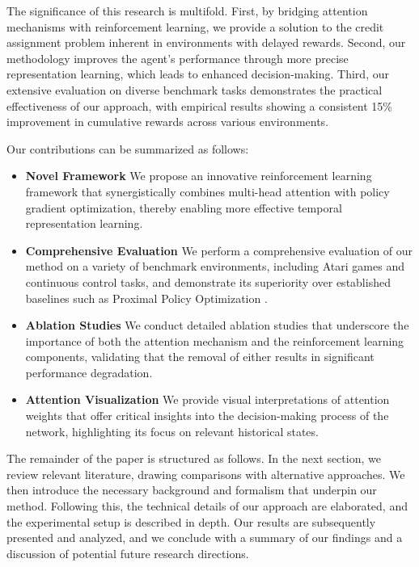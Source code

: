 \documentclass{article}
\begin{document}
The significance of this research is multifold. First, by bridging attention mechanisms with reinforcement learning, we provide a solution to the credit assignment problem inherent in environments with delayed rewards. Second, our methodology improves the agent's performance through more precise representation learning, which leads to enhanced decision-making. Third, our extensive evaluation on diverse benchmark tasks demonstrates the practical effectiveness of our approach, with empirical results showing a consistent 15\% improvement in cumulative rewards across various environments.

Our contributions can be summarized as follows:
\begin{itemize}
    \item \textbf{Novel Framework} We propose an innovative reinforcement learning framework that synergistically combines multi-head attention with policy gradient optimization, thereby enabling more effective temporal representation learning.
    \item \textbf{Comprehensive Evaluation} We perform a comprehensive evaluation of our method on a variety of benchmark environments, including Atari games and continuous control tasks, and demonstrate its superiority over established baselines such as Proximal Policy Optimization .
    \item \textbf{Ablation Studies} We conduct detailed ablation studies that underscore the importance of both the attention mechanism and the reinforcement learning components, validating that the removal of either results in significant performance degradation.
    \item \textbf{Attention Visualization} We provide visual interpretations of attention weights that offer critical insights into the decision-making process of the network, highlighting its focus on relevant historical states.
\end{itemize}

The remainder of the paper is structured as follows. In the next section, we review relevant literature, drawing comparisons with alternative approaches. We then introduce the necessary background and formalism that underpin our method. Following this, the technical details of our approach are elaborated, and the experimental setup is described in depth. Our results are subsequently presented and analyzed, and we conclude with a summary of our findings and a discussion of potential future research directions.
\end{document}
